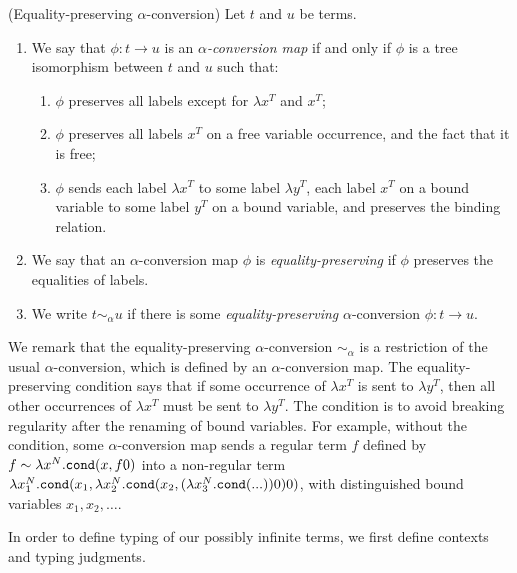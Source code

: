 \begin{definition}(Equality-preserving $\alpha$-conversion)
\label{definition-alpha-conversion}
Let $t$ and $u$ be terms.
\begin{enumerate}
\item
We say that $\phi:t \rightarrow u$ is an \emph{$\alpha$-conversion map} if and only if 
$\phi$ is a tree isomorphism between $t$ and $u$ such that:
\begin{enumerate}
\item
$\phi$ preserves all labels except for $\lambda x^T$ and $x^T$;
\item 
$\phi$ preserves all labels $x^T$
on a free variable occurrence, and the fact that it is free;
\item
$\phi$ sends each label $\lambda x^T$ to some label $\lambda y^T$, each label $x^T$
on a bound variable to some label $y^T$ on a bound variable, and preserves the
binding relation. 
\end{enumerate}

\item
  We say that an $\alpha$-conversion map $\phi$ is \emph{equality-preserving} if $\phi$ preserves
  the equalities of labels. 
\item
We write $t \sim_\alpha u$ if there is some \emph{equality-preserving} 
$\alpha$-conversion $\phi:t \rightarrow u$.
\end{enumerate}
\end{definition}

We remark that the equality-preserving $\alpha$-conversion $\sim_\alpha$ is
a restriction of the usual $\alpha$-conversion, which is defined by an $\alpha$-conversion map.
The equality-preserving condition says that if some occurrence of $\lambda x^T$ is sent to $\lambda y^T$, then
all other occurrences of $\lambda x^T$ must be sent to $\lambda y^T$. 
The condition is to avoid breaking regularity after the renaming of bound variables.
For example, without the condition, some $\alpha$-conversion map sends
a regular term $f$ defined by $f\sim \lambda x^{N}.{\tt cond}(x,f0)$ into
a non-regular term $\lambda x_1^{N}.{\tt cond}(x_1,\lambda x_2^{N}.{\tt cond}(x_2,(\lambda x_3^{N}.{\tt cond}(...))0)0)$,
with distinguished bound variables $x_1,x_2,\ldots$. 

In order to define typing of our possibly infinite terms, we first 
define contexts and typing judgments.


